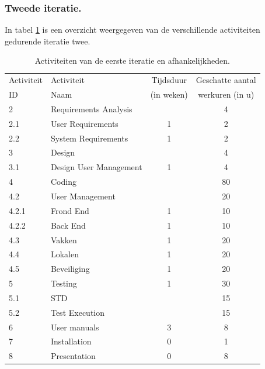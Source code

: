 \subsubsection{Tweede iteratie.}
In tabel \ref{tab:ActivityDependenciesIteratie2} is een overzicht weergegeven van de verschillende activiteiten gedurende iteratie twee.
\begin{table} [H]
	\centering
	\caption{Activiteiten van de eerste iteratie en afhankelijkheden.}
	\begin{tabular} {l|l|c|c}
		Activiteit & Activiteit & Tijdsduur & Geschatte aantal  \\
		ID & Naam & (in weken) & werkuren (in u) \\
		\hline
		2 	& Requirements Analysis 		&   & 4   	\\
		2.1 & User Requirements 			& 1 & 2  	\\
		2.2 & System Requirements 		& 1 & 2  	\\
		\hline
		3 	& Design 					&   & 4 	\\
		3.1 & Design User Management 	& 1 & 4 	\\
		\hline
		4 	& Coding 					&   & 80 	\\
		4.2 & User Management			&   & 20   	\\
		4.2.1 & Frond End 		 		& 1 & 10  	\\
		4.2.2 & Back End					& 1 & 10 	\\
		4.3 & Vakken 					& 1	& 20		\\
		4.4 & Lokalen					& 1	& 20		\\
		4.5 & Beveiliging				& 1	& 20		\\
		\hline
		5 	& Testing 					& 1 & 30  	\\
		5.1 & STD						&   & 15  	\\
		5.2 & Test Execution				&   & 15  	\\
		\hline
		6 	& User manuals 				& 3 & 8  	\\
		\hline
		7 	& Installation 				& 0 & 1  	\\
		\hline
		8 	& Presentation 				& 0 & 8 		\\
	\end{tabular}
	\label{tab:ActivityDependenciesIteratie2}
\end{table}


